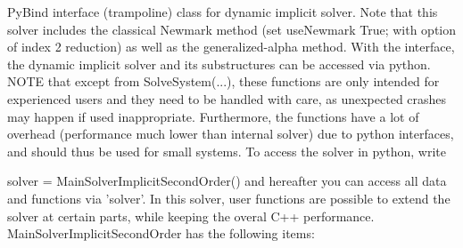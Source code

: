  \label{sec:MainSolverImplicitSecondOrder}
PyBind interface (trampoline) class for dynamic implicit solver. Note that this solver includes the classical Newmark method (set useNewmark True; with option of index 2 reduction) as well as the generalized-alpha method. With the interface, the dynamic implicit solver and its substructures can be accessed via python. NOTE that except from SolveSystem(...), these functions are only intended for experienced users and they need to be handled with care, as unexpected crashes may happen if used inappropriate. Furthermore, the functions have a lot of overhead (performance much lower than internal solver) due to python interfaces, and should thus be used for small systems. To access the solver in python, write \bi
 \item[] solver = MainSolverImplicitSecondOrder() 
\ei
 and hereafter you can access all data and functions via 'solver'.
 In this solver, user functions are possible to extend the solver at certain parts, while keeping the overal C++ performance.\\ 
%
MainSolverImplicitSecondOrder has the following items:
